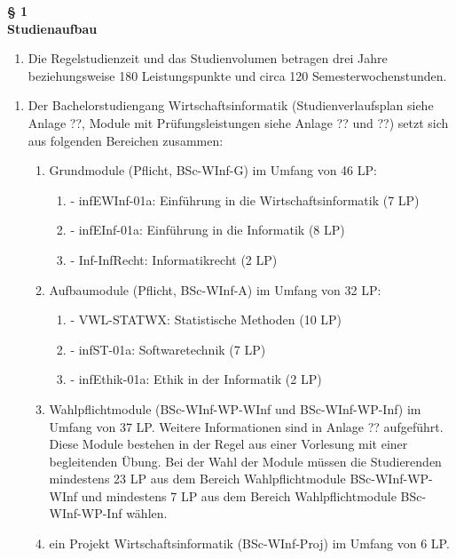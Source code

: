 \documentclass{article}\usepackage{helvet}\renewcommand{\familydefault}{\sfdefault}\usepackage[letterpaper,top=2cm,bottom=2cm,left=3cm,right=3cm,marginparwidth=1.75cm]{geometry}\usepackage[colorlinks=true,allcolors=red]{hyperref}\usepackage{enumitem}\usepackage{tabularx}\usepackage[T1]{fontenc}\usepackage[utf8]{inputenc}\usepackage{fancyhdr}\usepackage{lastpage}\pagestyle{fancy}\fancyhf{}\setlistdepth{9}
\begin{document}
	\hypertarget{par2}{
	\begin{center}
		\textbf{§ 1\\Studienaufbau}
	\end{center}
}
	\begin{enumerate}[start=1,label=(\arabic*)]
		\item{Die Regelstudienzeit und das Studienvolumen betragen drei Jahre beziehungsweise 180 Leistungspunkte und circa 120 Semesterwochenstunden.}
	\end{enumerate}

	\begin{enumerate}[start=2,label=(\arabic*)]
		\item{Der Bachelorstudiengang Wirtschaftsinformatik (Studienverlaufsplan siehe Anlage {\Large{??}}, Module mit Prüfungsleistungen siehe Anlage {\Large{??}} und {\Large{??}}) setzt sich aus folgenden Bereichen zusammen:
		\begin{enumerate}[label=\arabic*.]
			\item{Grundmodule (Pflicht, BSc-WInf-G) im Umfang von 46 LP:
			\begin{enumerate}[label=\alph*)]
				\item{- infEWInf-01a: Einführung in die Wirtschaftsinformatik (7 LP)}
				\item{- infEInf-01a: Einführung in die Informatik (8 LP)}
				\item{- Inf-InfRecht: Informatikrecht (2 LP)}
			\end{enumerate}
}
			\item{Aufbaumodule (Pflicht, BSc-WInf-A) im Umfang von 32 LP:
			\begin{enumerate}[label=\alph*)]
				\item{- VWL-STATWX: Statistische Methoden (10 LP)}
				\item{- infST-01a: Softwaretechnik (7 LP)}
				\item{- infEthik-01a: Ethik in der Informatik (2 LP)}
			\end{enumerate}
}
			\item{Wahlpflichtmodule (BSc-WInf-WP-WInf und BSc-WInf-WP-Inf) im Umfang von 37 LP. Weitere Informationen sind in Anlage {\Large{??}} aufgeführt. Diese Module bestehen in der Regel aus einer Vorlesung mit einer begleitenden Übung. Bei der Wahl der Module müssen die Studierenden mindestens 23 LP aus dem Bereich Wahlpflichtmodule BSc-WInf-WP-WInf und mindestens 7 LP aus dem Bereich Wahlpflichtmodule BSc-WInf-WP-Inf wählen.}
			\item{ein Projekt Wirtschaftsinformatik (BSc-WInf-Proj) im Umfang von 6 LP.}

\end{enumerate}}
\end{enumerate}
\end{document}
